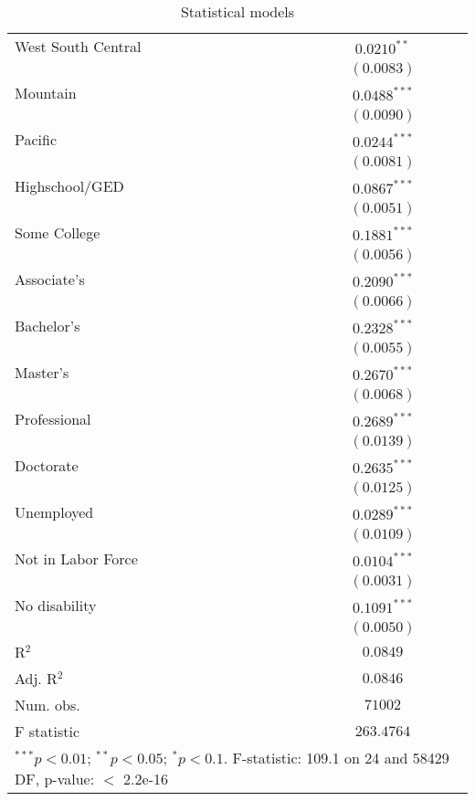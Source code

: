 \documentclass{article}
\begin{document}
\begin{table}
\begin{center}
\begin{tabular}{l c}
West South Central             & $0.0210^{**}$   \\
                               & $(0.0083)$      \\
Mountain                       & $0.0488^{***}$  \\
                               & $(0.0090)$      \\
Pacific                        & $0.0244^{***}$  \\
                               & $(0.0081)$      \\
Highschool/GED                 & $0.0867^{***}$  \\
                               & $(0.0051)$      \\
Some College                   & $0.1881^{***}$  \\
                               & $(0.0056)$      \\
Associate's                    & $0.2090^{***}$  \\
                               & $(0.0066)$      \\
Bachelor's                     & $0.2328^{***}$  \\
                               & $(0.0055)$      \\
Master's                       & $0.2670^{***}$  \\
                               & $(0.0068)$      \\
Professional                   & $0.2689^{***}$  \\
                               & $(0.0139)$      \\
Doctorate                      & $0.2635^{***}$  \\
                               & $(0.0125)$      \\
Unemployed                     & $0.0289^{***}$  \\
                               & $(0.0109)$      \\
Not in Labor Force             & $0.0104^{***}$  \\
                               & $(0.0031)$      \\
No disability                  & $0.1091^{***}$  \\
                               & $(0.0050)$      \\
\hline
R$^2$                          & $0.0849$        \\
Adj. R$^2$                     & $0.0846$        \\
Num. obs.                      & $71002$         \\
F statistic                    & $263.4764$      \\
\hline
\multicolumn{2}{l}{\scriptsize{$^{***}p<0.01$; $^{**}p<0.05$; $^{*}p<0.1$. 
F-statistic: 109.1 on 24 and 58429 DF, p-value: $<$ 2.2e-16}}
\end{tabular}
\caption{Statistical models}
\label{table:coefficients}
\end{center}
\end{table}
\end{document}
